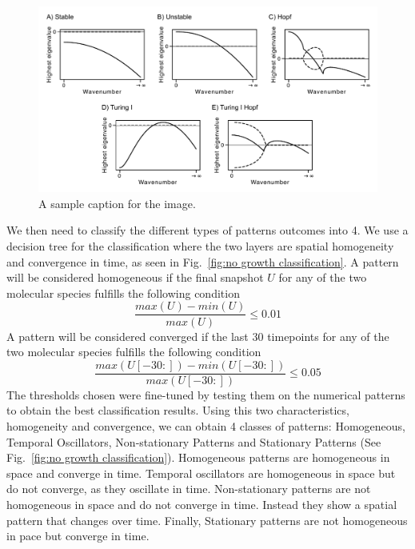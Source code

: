 \begin{figure}[H] %
    \centering
    \includegraphics[width=1\textwidth]{chapters/Chapter 1/dispersions} %
    \caption{A sample caption for the image.}
    \label{fig:dispersions} %
\end{figure} %

We then need to classify the different types of patterns outcomes into 4.
We use a decision tree for the classification where the two layers are spatial homogeneity and convergence in time, as seen in Fig.~\ref{fig:no growth classification}.
A pattern will be considered homogeneous if the final snapshot $U$ for any of the two molecular species fulfills the following condition
\begin{equation}
    \frac{max(U) - min(U)}{max(U)} \leq 0.01
\end{equation}
A pattern will be considered converged if the last 30 timepoints for any of the two molecular species fulfills the following condition
\begin{equation}
    \frac{max(U[-30:]) - min(U[-30:])}{max(U[-30:])} \leq 0.05
\end{equation}
The thresholds chosen were fine-tuned by testing them on the numerical patterns to obtain the best classification results.
Using this two characteristics, homogeneity and convergence, we can obtain 4 classes of patterns: Homogeneous, Temporal Oscillators, Non-stationary Patterns and Stationary Patterns (See Fig.~\ref{fig:no growth classification}).
Homogeneous patterns are homogeneous in space and converge in time.
Temporal oscillators are homogeneous in space but do not converge, as they oscillate in time.
Non-stationary patterns are not homogeneous in space and do not converge in time.
Instead they show a spatial pattern that changes over time.
Finally, Stationary patterns are not homogeneous in pace but converge in time.


